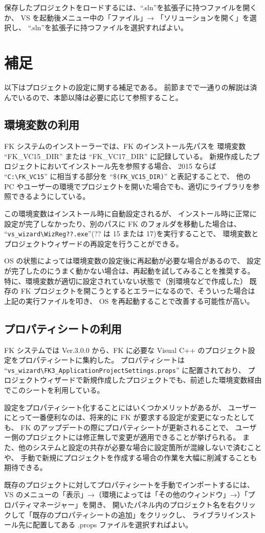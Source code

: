 \documentclass[a4j]{jarticle}
\begin{document}
保存したプロジェクトをロードするには、``.sln''を拡張子に持つファイルを開くか、
VS を起動後メニュー中の「ファイル」→ 「ソリューションを開く」を選択し、
``.sln''を拡張子に持つファイルを選択すればよい。

\appendix

\section{補足}
以下はプロジェクトの設定に関する補足である。
前節までで一通りの解説は済んでいるので、本節以降は必要に応じて参照すること。

\subsection{環境変数の利用}
FK システムのインストーラーでは、FK のインストール先パスを
環境変数 ``FK\_VC15\_DIR'' または ``FK\_VC17\_DIR'' に記録している。
新規作成したプロジェクトにおいてインストール先を参照する場合、
2015 ならば ``\verb+C:\FK_VC15+'' に相当する部分を ``\$\verb+(FK_VC15_DIR)+'' と表記することで、
他の PC やユーザーの環境でプロジェクトを開いた場合でも、適切にライブラリを参照できるようにしている。

この環境変数はインストール時に自動設定されるが、
インストール時に正常に設定が完了しなかったり、別のパスに FK のフォルダを移動した場合は、
``\verb+vs_wizard\WizReg??.exe+''(?? は 15 または 17)を実行することで、
環境変数とプロジェクトウィザードの再設定を行うことができる。

OS の状態によっては環境変数の設定後に再起動が必要な場合があるので、
設定が完了したのにうまく動かない場合は、再起動を試してみることを推奨する。
特に、環境変数が適切に設定されていない状態で（別環境などで作成した）
既存の FK プロジェクトを開こうとするとエラーになるので、そういった場合は上記の実行ファイルを叩き、
OS を再起動することで改善する可能性が高い。


\subsection{プロパティシートの利用}
FK システムでは Ver.3.0.0 から、FK に必要な Visual C++ のプロジェクト設定をプロパティシートに集約した。
プロパティシートは ``\verb+vs_wizard\FK3_ApplicationProjectSettings.props+'' に配置されており、
プロジェクトウィザードで新規作成したプロジェクトでも、前述した環境変数経由でこのシートを利用している。

設定をプロパティシート化することにはいくつかメリットがあるが、
ユーザーにとって一番便利なのは、将来的に FK が要求する設定が変更になったとしても、
FK のアップデートの際にプロパティシートが更新されることで、
ユーザー側のプロジェクトには修正無しで変更が適用できることが挙げられる。
また、他のシステムと設定の共存が必要な場合に設定箇所が混線しないで済むことや、
手動で新規にプロジェクトを作成する場合の作業を大幅に削減することも期待できる。

既存のプロジェクトに対してプロパティシートを手動でインポートするには、
VS のメニューの「表示」→（環境によっては「その他のウィンドウ」→）「プロパティマネージャー」を開き、
開いたパネル内のプロジェクト名を右クリックして「既存のプロパティシートの追加」をクリックし、
ライブラリインストール先に配置してある .props ファイルを選択すればよい。
\end{document}
